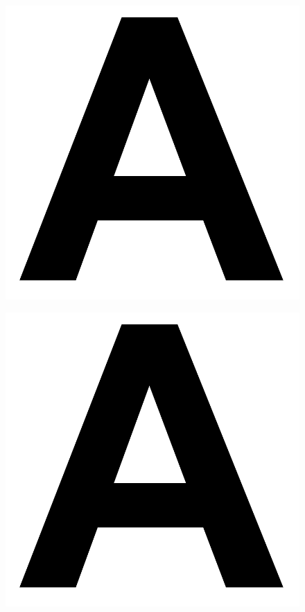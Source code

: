 \documentclass{beamer}
\begin{document}
\begin{frame}
 \begin{figure}
  \includegraphics[scale=.2]{graficos/letra.png}
 \end{figure}
\end{frame}

\begin{frame}
 \begin{figure}
  \includegraphics[scale=.2]{graficos/letra.png}
 \end{figure}
\end{frame}
\end{document}
